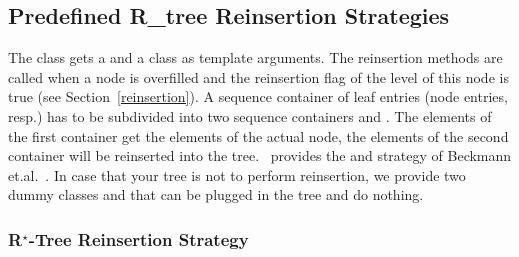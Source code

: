 \subsection{Predefined R\_tree Reinsertion Strategies}
\label{Reinsertpre}
\label{Reinsertionpre}

The  class gets a  and a
  class as template
arguments. 
The reinsertion methods are called when a node is
overfilled and the reinsertion flag of the level of this node 
 is true (see Section~\ref{reinsertion}).
A sequence container of leaf  entries (node
entries, resp.) has to be subdivided into two sequence containers 
 and . The elements of the
first container get the elements of the actual node, the elements 
of the second container will be reinserted into the tree.
\cgal\  provides the 
 and   
strategy of Beckmann
et.al.~\cite{Beckmann:1990:RER}. 
In case that your tree is not to perform reinsertion, we provide
two dummy classes  and
 that can be plugged in the tree and do nothing.

\subsubsection{R$^\star$-Tree Reinsertion Strategy}

